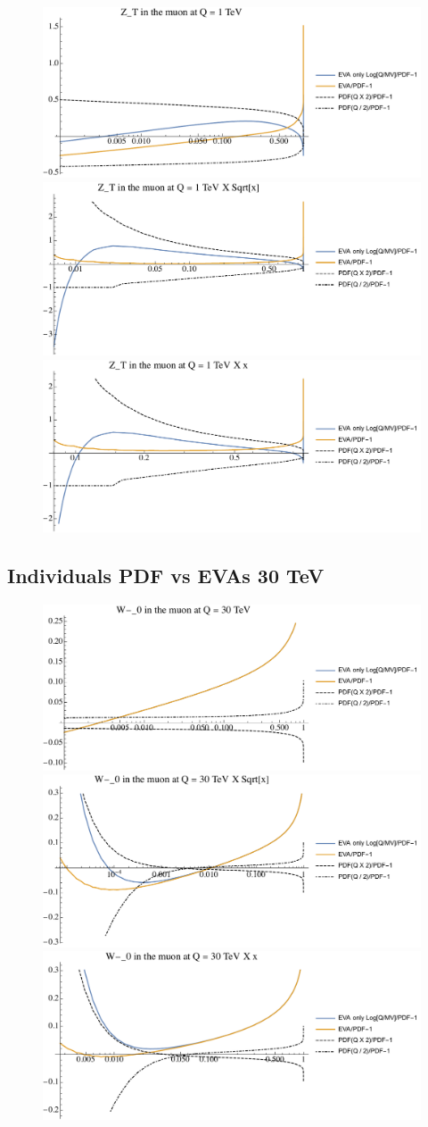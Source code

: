 \documentclass[a4paper,11pt]{article}
\begin{document}
\begin{figure}[ht]
\includegraphics[width=0.4\linewidth]{PlotPDFs/ratios/1TeV/Z_T_Q.pdf}
\includegraphics[width=0.4\linewidth]{PlotPDFs/ratios/1TeV/Z_T_Qsqrtx.pdf}
\includegraphics[width=0.4\linewidth]{PlotPDFs/ratios/1TeV/Z_T_Qx.pdf}
\end{figure}

\clearpage
\subsection{Individuals PDF vs EVAs 30 TeV}

\begin{figure}[ht]
\includegraphics[width=0.4\linewidth]{PlotPDFs/ratios/30TeV/W-_0_Q.pdf}
\includegraphics[width=0.4\linewidth]{PlotPDFs/ratios/30TeV/W-_0_Qsqrtx.pdf}
\includegraphics[width=0.4\linewidth]{PlotPDFs/ratios/30TeV/W-_0_Qx.pdf}
\end{figure}
\end{document}
